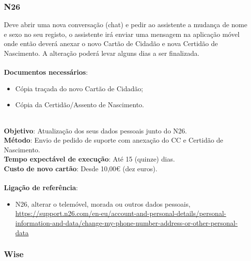 \subsubsection{N26}

Deve abrir uma nova conversação (chat) e pedir ao assistente a mudança
de nome e sexo no seu registo, o assistente irá enviar uma mensagem na
aplicação móvel onde então deverá anexar o novo Cartão de Cidadão e nova
Certidão de Nascimento. A alteração poderá levar alguns dias a ser
finalizada. \\
\\
\textbf{Documentos necessários}:
\begin{itemize}
	\item Cópia traçada do novo Cartão de Cidadão;
	\item Cópia da Certidão/Assento de Nascimento.
\end{itemize}
\leavevmode\\
\textbf{Objetivo}: Atualização dos seus dados pessoais junto do N26. \\
\textbf{Método}: Envio de pedido de suporte com anexação do CC e Certidão de Nascimento. \\
\textbf{Tempo expectável de execução}: Até 15 (quinze) dias. \\ 
\textbf{Custo de novo cartão}: Desde 10,00€ (dez euros). \\
\\
\textbf{Ligação de referência}:
\begin{itemize}
	\item N26, alterar o telemóvel, morada ou outros dados pessoais, \url{https://support.n26.com/en-eu/account-and-personal-details/personal-information-and-data/change-my-phone-number-address-or-other-personal-data}
\end{itemize}

\newpage

\subsubsection{Wise}

